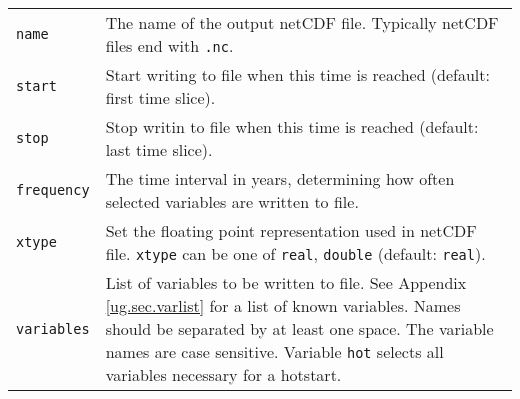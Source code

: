 \begin{center}
\begin{supertabular*}{\textwidth}{@{\extracolsep{\fill}}|l|p{11cm}|}
    \hline
    \texttt{name} & The name of the output netCDF file. Typically netCDF files end with \texttt{.nc}.\\
    \texttt{start} & Start writing to file when this time is reached (default: first time slice).\\
    \texttt{stop} & Stop writin to file when this time is reached (default: last time slice). \\
    \texttt{frequency} & The time interval in years, determining how often selected variables are written to file.\\
    \texttt{xtype} & Set the floating point representation used in netCDF file. \texttt{xtype} can be one of \texttt{real}, \texttt{double} (default: \texttt{real}). \\
    \texttt{variables} & List of variables to be written to file. See Appendix \ref{ug.sec.varlist} for a list of known variables. Names should be separated by at least one space. The variable names are case sensitive. Variable \texttt{hot} selects all variables necessary for a hotstart.\\
    \hline
  \end{supertabular*}
\end{center}
